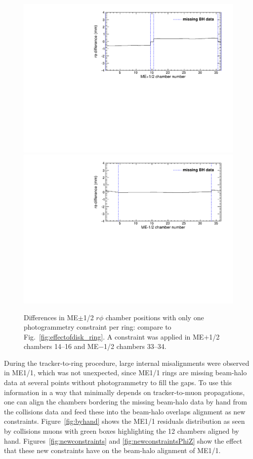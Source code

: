\documentclass[12pt]{article}
\begin{document}
\begin{figure}
\includegraphics[width=0.5\linewidth]{effectofdiskOnlyOne_ring_mep12.pdf}
\includegraphics[width=0.5\linewidth]{effectofdiskOnlyOne_ring_mem12.pdf}

\caption{Differences in ME$\pm$1/2 $r\phi$ chamber positions with only
  one photogrammetry constraint per ring: compare to
  Fig.~\ref{fig:effectofdisk_ring}.  A constraint was applied in
  ME$+$1/2 chambers 14--16 and ME$-$1/2 chambers
  33--34. \label{fig:effectofdiskOnlyOne_ring}}
\end{figure}

During the tracker-to-ring procedure, large internal misalignments
were observed in ME1/1, which was not unexpected, since ME1/1 rings
are missing beam-halo data at several points without photogrammetry to
fill the gaps.  To use this information in a way that minimally
depends on tracker-to-muon propagations, one can align the chambers
bordering the missing beam-halo data by hand from the collisions data
and feed these into the beam-halo overlaps alignment as new
constraints.  Figure~\ref{fig:byhand} shows the ME1/1 residuals
distribution as seen by collisions muons with green boxes highlighting
the 12 chambers aligned by hand.  Figures~\ref{fig:newconstraints} and
\ref{fig:newconstraintsPhiZ} show the effect that these new
constraints have on the beam-halo alignment of ME1/1.
\end{document}
